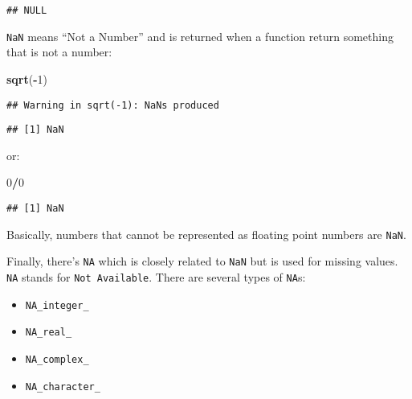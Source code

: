 \documentclass[
]{article}
\newenvironment{Shaded}{\begin{snugshade}}{\end{snugshade}}
\newcommand{\DecValTok}[1]{\textcolor[rgb]{0.00,0.00,0.81}{#1}}
\newcommand{\KeywordTok}[1]{\textcolor[rgb]{0.13,0.29,0.53}{\textbf{#1}}}
\newcommand{\NormalTok}[1]{#1}
\newcommand{\OperatorTok}[1]{\textcolor[rgb]{0.81,0.36,0.00}{\textbf{#1}}}
\providecommand{\tightlist}{%
  \setlength{\itemsep}{0pt}\setlength{\parskip}{0pt}}
\begin{document}
\begin{Shaded}
\end{Shaded}

\begin{verbatim}
## NULL
\end{verbatim}

\texttt{NaN} means ``Not a Number'' and is returned when a function return something that is not a number:

\begin{Shaded}
\begin{Highlighting}[]
\KeywordTok{sqrt}\NormalTok{(}\OperatorTok{{-}}\DecValTok{1}\NormalTok{)}
\end{Highlighting}
\end{Shaded}

\begin{verbatim}
## Warning in sqrt(-1): NaNs produced
\end{verbatim}

\begin{verbatim}
## [1] NaN
\end{verbatim}

or:

\begin{Shaded}
\begin{Highlighting}[]
\DecValTok{0}\OperatorTok{/}\DecValTok{0}
\end{Highlighting}
\end{Shaded}

\begin{verbatim}
## [1] NaN
\end{verbatim}

Basically, numbers that cannot be represented as floating point numbers are \texttt{NaN}.

Finally, there's \texttt{NA} which is closely related to \texttt{NaN} but is used for missing values. \texttt{NA} stands for \texttt{Not\ Available}. There are
several types of \texttt{NA}s:

\begin{itemize}
\tightlist
\item
  \texttt{NA\_integer\_}
\item
  \texttt{NA\_real\_}
\item
  \texttt{NA\_complex\_}
\item
  \texttt{NA\_character\_}
\end{itemize}
\end{document}
